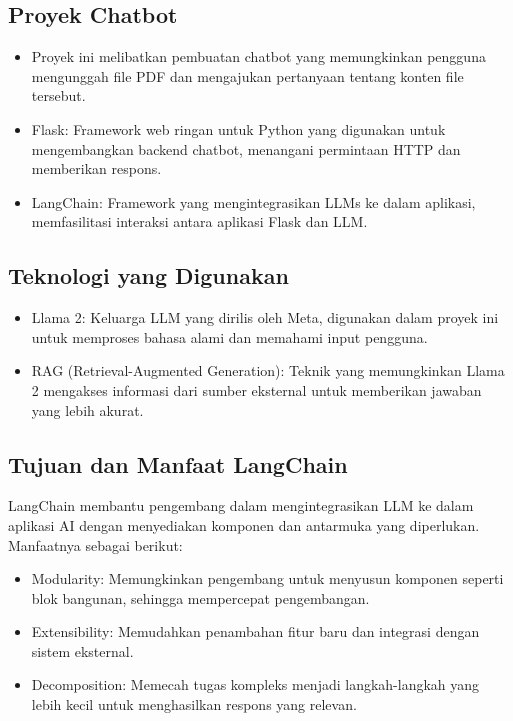 \documentclass{article}
\begin{document}
\subsection{Proyek Chatbot}
\begin{itemize}
    \item Proyek ini melibatkan pembuatan chatbot yang memungkinkan pengguna mengunggah file PDF dan mengajukan pertanyaan tentang konten file tersebut.
    \item Flask: Framework web ringan untuk Python yang digunakan untuk mengembangkan backend chatbot, menangani permintaan HTTP dan memberikan respons.
    \item LangChain: Framework yang mengintegrasikan LLMs ke dalam aplikasi, memfasilitasi interaksi antara aplikasi Flask dan LLM.
\end{itemize}

\subsection{Teknologi yang Digunakan}
\begin{itemize}
    \item Llama 2: Keluarga LLM yang dirilis oleh Meta, digunakan dalam proyek ini untuk memproses bahasa alami dan memahami input pengguna.
    \item RAG (Retrieval-Augmented Generation): Teknik yang memungkinkan Llama 2 mengakses informasi dari sumber eksternal untuk memberikan jawaban yang lebih akurat.
\end{itemize}

\subsection{Tujuan dan Manfaat LangChain}
LangChain membantu pengembang dalam mengintegrasikan LLM ke dalam aplikasi AI dengan menyediakan komponen dan antarmuka yang diperlukan. Manfaatnya sebagai berikut:
\begin{itemize}
    \item Modularity: Memungkinkan pengembang untuk menyusun komponen seperti blok bangunan, sehingga mempercepat pengembangan.
    \item Extensibility: Memudahkan penambahan fitur baru dan integrasi dengan sistem eksternal.
    \item Decomposition: Memecah tugas kompleks menjadi langkah-langkah yang lebih kecil untuk menghasilkan respons yang relevan.
\end{itemize}
\end{document}
